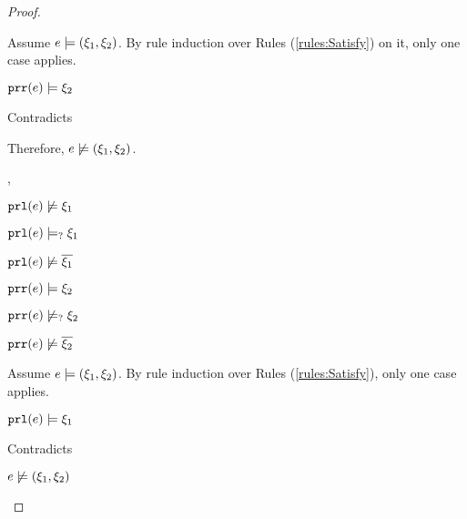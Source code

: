 \begin{proof}
\begin{byCases}
\begin{byCases}
\begin{byCases}
            Assume $e \models (\xi_1 , \xi_2)$. By rule induction over Rules (\ref{rules:Satisfy}) on it, only one case applies.
            \begin{byCases}
            \item[\text{(\ref{rule:CSNotValPair})}]
                \begin{pfsteps*}
                \item $\mathtt{prr}(e) \models \xi_2$ 
                \end{pfsteps*}
                Contradicts 
            \end{byCases}
            Therefore, $e \not\models (\xi_1 , \xi_2)$.
        \item[\cmaysatisfy{\hprl{e}}{\xi_1},\csatisfy{\hprr{e}}{\xi_2}]
            \begin{pfsteps*}
            \item $\mathtt{prl}(e) \not\models \xi_1$  
            \item $\mathtt{prl}(e) \models_{?} \xi_1$  
            \item $\mathtt{prl}(e) \not\models \overline{\xi_1}$  
            \item $\mathtt{prr}(e) \models \xi_2$  
            \item $\mathtt{prr}(e) \not\models_{?} \xi_2$  
            \item $\mathtt{prr}(e) \not\models \overline{\xi_2}$  
            \end{pfsteps*}
            Assume $e \models (\xi_1 , \xi_2)$. By rule induction over Rules (\ref{rules:Satisfy}), only one case applies.
            \begin{byCases}
            \item[\text{(\ref{rule:CSNotValPair})}]
                \begin{pfsteps*}
                \item $\mathtt{prl}(e) \models \xi_1$ 
                \end{pfsteps*}
                Contradicts 
            \end{byCases}
            \begin{pfsteps*}
            \item $e \not\models (\xi_1 , \xi_2)$  

\end{pfsteps*}
\end{byCases}
\end{byCases}
\end{byCases}
\end{proof}
